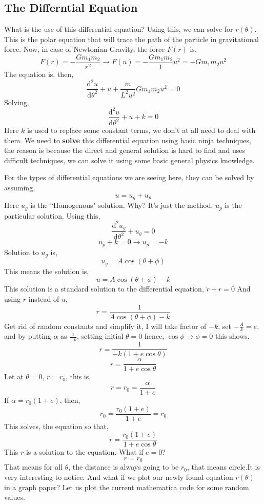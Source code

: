 \documentclass[12pt,a4paper]{article}
\begin{document}
\subsection{ The Differntial Equation }
What is the use of this differential equation? Using this, we can solve for $r(\theta)$. This is the polar equation that will trace the path of the particle in gravitational force. Now, in case of Newtonian Gravity, the force $F(r)$ is, 
\[ 
    F (r) = -\frac{Gm_1m_2}{r^2} \to F(u) = - \frac{Gm_1m_2}{1} u^2 = - G m_1 m_2 u^2
\] 
The equation is, then,
\[ 
\frac{\mathrm{d} ^2 u}{\mathrm{d} \theta^2} + u + \frac{m}{L^2 u^2} G m_1 m_2 u^2 = 0
\]
Solving,
\[ 
\frac{\mathrm{d} ^2 u}{\mathrm{d} \theta ^2} + u + k = 0
\]
Here $k$ is used to replace some constant terms, we don't at all need to deal with them.
We need to \textbf{solve} this differential equation using basic ninja techniques, the reason is because the direct and general solution is hard to find and uses difficult techniques, we can solve it using some basic general physics knowledge.

For the types of differential equations we are seeing here, they can be solved by assuming,
\[ 
u = u_g + u_p
\]
Here $u_g$ is the ``Homogenous" solution. Why? It's just the method. $u_p$ is the particular solution. Using this, 
\[ 
\frac{\mathrm{d} ^2 u_g}{\mathrm{d} \theta^2} + u_g = 0
\]
\[ 
u_p + k = 0 \to u_p = -k
\]
Solution to $u_g$ is,
\[ 
    u_g = A \cos(\theta + \phi) 
\]
This means the solution is,
\[ 
    u = A \cos \left( \theta + \phi \right) - k
\]
This solution is a standard solution to the differential equation, $\ddot{ r }+ r = 0$
And using $r$ instead of $u$,
\[ 
    r = \frac{1}{A \cos \left( \theta + \phi \right) - k}       
\]
Get rid of random constants and simplify it, I will take factor of $-k$, set $-\frac{A}{k} = e$, and by putting $\alpha$ as $\frac{1}{-k}$, setting initial $\theta = 0$ hence, $\cos\phi  \to \phi = 0$ this shows,
\[ 
    r = \frac{1}{-k \left( 1 + e \cos \theta \right) } 
\]
\[ 
r = \frac{\alpha}{1 + e \cos \theta}
\]
Let at $\theta = 0$, $r=r_0$, this is,
\[ 
r = r_0 = \frac{\alpha}{1 + e}
\]
If $\alpha = r_0 \left( 1 + e \right) $, then, 
\[ 
    r_0 = \frac{r_0 \left( 1 + e \right) }{1 + e} = r_0
\]
This solves, the equation so that, 
\[ 
    \boxed{ r = \frac{r_0 \left( 1 + e \right) }{1 + e \cos \theta}}
\]
This $r$ is a solution to the equation. What if $e=0$? 
\[ 
r = r_0 
\] That means for all  $\theta$, the distance is always going to be $r_0$, that means circle.It is very interesting to notice. And what if we plot our newly found equation $r(\theta)$ in a graph paper? Let us plot the current mathematica code for some random values.
\end{document}
